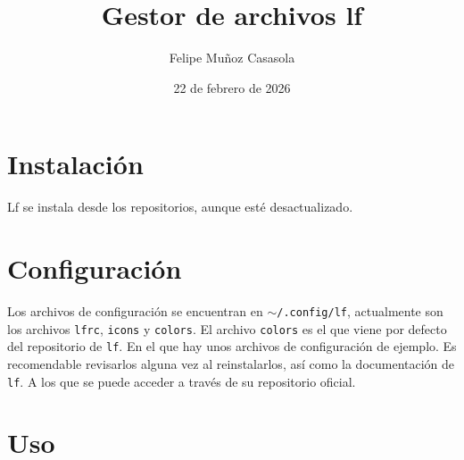 \documentclass{article}
\title{Gestor de archivos lf}
\author{Felipe Muñoz Casasola}
\date{22 de febrero de 2026}
\begin{document}
    \maketitle
    \clearpage

    \section{Instalación}
    Lf se instala desde los repositorios, aunque esté desactualizado.

    \section{Configuración}
    Los archivos de configuración se encuentran en \texttt{$\sim$/.config/lf},
    actualmente son los archivos \texttt{lfrc}, \texttt{icons} y \texttt{colors}.
    El archivo \texttt{colors} es el que viene por defecto del repositorio de
    \texttt{lf}. En el que hay unos archivos de configuración de ejemplo. Es
    recomendable revisarlos alguna vez al reinstalarlos, así como la
    documentación de \texttt{lf}. A los que se puede acceder a través de su
    repositorio oficial.

    \section{Uso}
\end{document}
